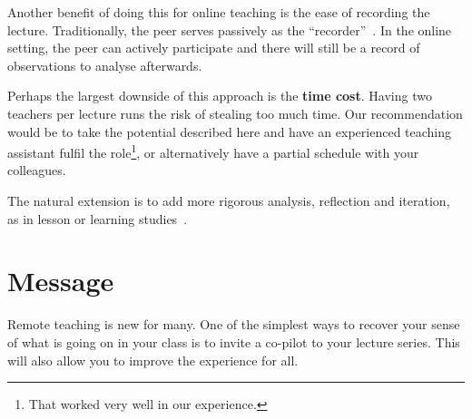 \documentclass[sigconf]{acmart}
\begin{document}
Another benefit of doing this for online teaching is the ease of recording the 
lecture.
Traditionally, the peer serves passively as the 
\enquote{recorder}~\cite{PeerObservation,ReflectivePeerObservation}.
In the online setting, the peer can actively participate and there will still 
be a record of observations to analyse afterwards.

Perhaps the largest downside of this approach is the \textbf{time cost}. Having 
two teachers per lecture runs the risk of stealing too much time. Our 
recommendation would be to take the potential described here and have an 
experienced teaching assistant fulfil the role\footnote{%
  That worked very well in our experience.
}, or alternatively have a partial schedule
with your colleagues.

The natural extension is to add more rigorous analysis, reflection and 
iteration, as in lesson or learning 
studies~\cite{NecessaryConditionsOfLearning}.


\section*{Message}

Remote teaching is new for many.
One of the simplest ways to recover your sense of what is going on in your class is to invite a co-pilot to your lecture series.
This will also allow you to improve the experience for all.



\end{document}
